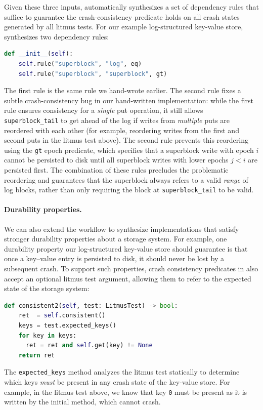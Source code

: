 Given these three inputs,
\depsynth automatically synthesizes a set of dependency rules
that suffice to guarantee the crash-consistency predicate holds
on all crash states generated by all litmus tests.
For our example log-structured key-value store,
\depsynth synthesizes two dependency rules:
%
\begin{lstlisting}[language=py]
  def __init__(self):
    self.rule("superblock", "log", eq)
    self.rule("superblock", "superblock", gt)
\end{lstlisting}
%
The first rule is the same rule we hand-wrote earlier.
The second rule fixes a subtle crash-consistency bug in our hand-written implementation:
while the first rule ensures consistency for a \emph{single} put operation,
it still allows \texttt{superblock_tail} to get ahead of the log
if writes from \emph{multiple} puts are reordered with each other
(for example, reordering writes from the first and second puts in the litmus test above).
The second rule prevents this reordering using the \texttt{gt} epoch predicate,
which specifies that a superblock write with epoch $i$
cannot be persisted to disk until all superblock writes with lower epochs $j < i$ are persisted first.
The combination of these rules
precludes the problematic reordering
and guarantees that the superblock always refers to a valid \emph{range} of log blocks,
rather than only requiring the block at \texttt{superblock_tail} to be valid.

\paragraph{Durability properties.}
We can also extend the \depsynth workflow to synthesize implementations
that satisfy stronger durability properties about a storage system.
For example, one durability property our log-structured key-value store should guarantee
is that once a key--value entry is persisted to disk,
it should never be lost by a subsequent crash.
To support such properties, crash consistency predicates in \depsynth
also accept an optional litmus test argument,
allowing them to refer to the expected state of the storage system:
%
\begin{lstlisting}[language=py]
  def consistent2(self, test: LitmusTest) -> bool:
    ret  = self.consistent()
    keys = test.expected_keys()
    for key in keys:
      ret = ret and self.get(key) != None
    return ret
\end{lstlisting}
%
The \texttt{expected_keys} method analyzes the litmus test statically to determine which keys
\emph{must} be present in any crash state of the key-value store.
For example, in the litmus test above,
we know that key \texttt{0} must be present as it is written by the initial method, which cannot crash.

